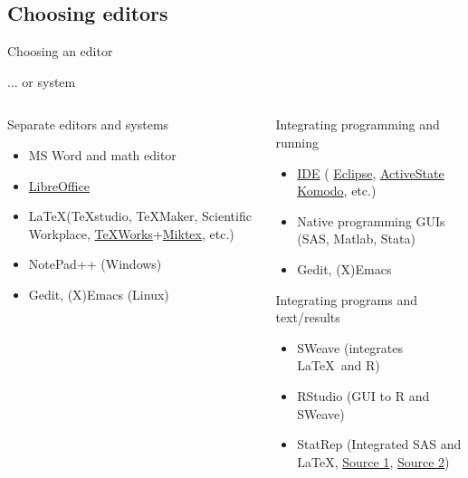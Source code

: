 \documentclass[xcolor=table,compress]{beamer}
\begin{document}
\subsection[Editors]{Choosing editors}
\begin{frame}{Choosing an editor}
\begin{block}{... or system}
\begin{columns}[t]
\begin{column}{.48\textwidth}
\color{red}
Separate editors and systems 
\begin{itemize}
\item MS Word and math editor
\item \href{http://www.libreoffice.org}{LibreOffice}
\item \LaTeX (TeXstudio, TeXMaker, Scientific Workplace, \href{http://www.tug.org/texworks/}{TeXWorks}+\href{http://miktex.org/}{Miktex}, etc.)
\item NotePad++ (Windows)
\item Gedit, (X)Emacs (Linux)
\end{itemize}
\end{column}
\hfill
\begin{column}{.48\textwidth}
\color{blue}
Integrating programming and running
\begin{itemize}
\item \href{http://en.wikipedia.org/wiki/Integrated_development_environment}{IDE} ( \href{http://en.wikipedia.org/wiki/Eclipse_(software)}{Eclipse}, \href{http://en.wikipedia.org/wiki/ActiveState_Komodo}{ActiveState Komodo}, etc.)
\item Native programming GUIs (SAS, Matlab, Stata)
\item Gedit, (X)Emacs 
\end{itemize}
Integrating programs and text/results
\begin{itemize}
\item SWeave (integrates \LaTeX \ and R)
\item RStudio (GUI to R and SWeave)
\item StatRep (Integrated SAS and \LaTeX, \href{http://support.sas.com/resources/papers/proceedings12/324-2012.pdf}{Source 1}, \href{http://support.sas.com/StatRepPackage}{Source 2})
\end{itemize}
\end{column}
\end{columns}


\end{block}

\end{frame}
\end{document}
